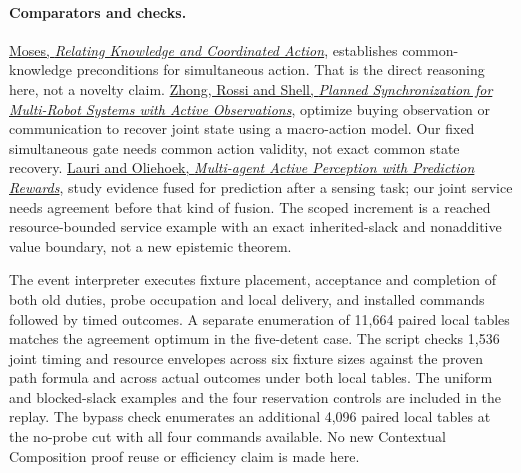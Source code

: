 \documentclass[11pt]{article}
\begin{document}
\paragraph{Comparators and checks.}
\href{https://arxiv.org/abs/1606.07525}{Moses, \emph{Relating Knowledge and Coordinated Action}}, establishes common-knowledge preconditions for simultaneous action. That is the direct reasoning here, not a novelty claim. \href{https://pmc.ncbi.nlm.nih.gov/articles/PMC12738390/}{Zhong, Rossi and Shell, \emph{Planned Synchronization for Multi-Robot Systems with Active Observations}}, optimize buying observation or communication to recover joint state using a macro-action model. Our fixed simultaneous gate needs common action validity, not exact common state recovery. \href{https://papers.neurips.cc/paper_files/paper/2020/hash/9db6faeef387dc789777227a8bed4d52-Abstract.html}{Lauri and Oliehoek, \emph{Multi-agent Active Perception with Prediction Rewards}}, study evidence fused for prediction after a sensing task; our joint service needs agreement before that kind of fusion. The scoped increment is a reached resource-bounded service example with an exact inherited-slack and nonadditive value boundary, not a new epistemic theorem.

The event interpreter executes fixture placement, acceptance and completion of both old duties, probe occupation and local delivery, and installed commands followed by timed outcomes. A separate enumeration of 11,664 paired local tables matches the agreement optimum in the five-detent case. The script checks 1,536 joint timing and resource envelopes across six fixture sizes against the proven path formula and across actual outcomes under both local tables. The uniform and blocked-slack examples and the four reservation controls are included in the replay. The bypass check enumerates an additional 4,096 paired local tables at the no-probe cut with all four commands available. No new Contextual Composition proof reuse or efficiency claim is made here.
\end{document}
